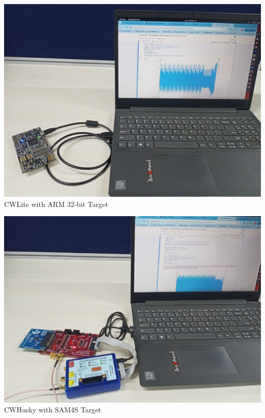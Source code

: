   \begin{minipage}[b]{0.3\linewidth}
    \centering
    \includegraphics[width=\linewidth]{images/cwlite_hardware.png}
    \smallskip
    CWLite with ARM 32-bit Target
  \end{minipage}
  \hfill
  \begin{minipage}[b]{0.3\linewidth}
    \centering
    \includegraphics[width=\linewidth]{images/cwhusky_hardware.png}
    \smallskip
   CWHusky with SAM4S Target
  \end{minipage}
  \hfill
